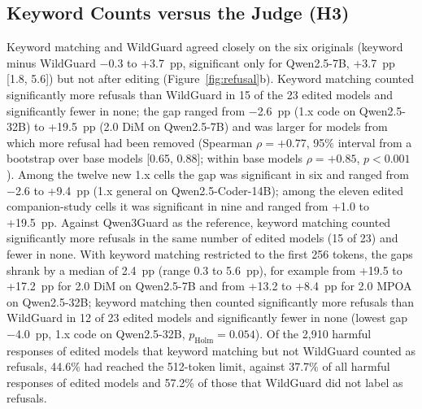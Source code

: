 \begin{table}[tbp]
\centering\small
\caption{H2: Heretic~1.x general versus code variant by prompt subset (WildGuard residual refusal; paired
Newcombe 95\% CI; exact McNemar, Holm over the six models within each subset). A negative difference means that
the general variant left less residual refusal.}
\label{tab:h2}
\setlength{\tabcolsep}{3pt}
\resizebox{\textwidth}{!}{}
\end{table}

\subsection{Keyword Counts versus the Judge (H3)}

Keyword matching and WildGuard agreed closely on the six originals (keyword minus WildGuard $-$0.3 to +3.7~pp,
significant only for Qwen2.5-7B, +3.7~pp [1.8, 5.6]) but not after editing (Figure~\ref{fig:refusal}b). Keyword
matching counted significantly more refusals than WildGuard in 15 of the 23 edited models and significantly fewer in
none; the gap ranged from $-$2.6~pp (1.x code on Qwen2.5-32B) to +19.5~pp (2.0 DiM on Qwen2.5-7B) and was larger for
models from which more refusal had been removed (Spearman $\rho=+0.77$, 95\% interval from a bootstrap over base
models [0.65, 0.88]; within base models $\rho=+0.85$, $p<0.001$). Among the twelve new 1.x
cells the gap was significant in six and ranged from $-$2.6 to +9.4~pp (1.x general on Qwen2.5-Coder-14B); among the
eleven edited companion-study cells it was significant in nine and ranged from +1.0 to +19.5~pp. Against Qwen3Guard
as the reference, keyword matching counted significantly more refusals in the same number of edited models (15 of
23) and fewer in none. With keyword matching restricted to the first 256 tokens, the gaps shrank by a median of
2.4~pp (range 0.3 to 5.6~pp), for example from +19.5 to +17.2~pp for 2.0 DiM on Qwen2.5-7B and from +13.2 to
+8.4~pp for 2.0 MPOA on Qwen2.5-32B; keyword matching then counted significantly more refusals than WildGuard in 12
of 23 edited models and significantly fewer in none (lowest gap $-$4.0~pp, 1.x code on Qwen2.5-32B,
$p_\mathrm{Holm}=0.054$). Of the 2{,}910 harmful responses of edited models that keyword matching but not WildGuard
counted as refusals, 44.6\% had reached the 512-token limit, against 37.7\% of all harmful responses of edited
models and 57.2\% of those that WildGuard did not label as refusals.

